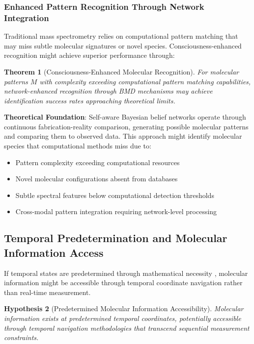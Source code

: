 \documentclass[11pt,a4paper]{article}
\newtheorem{theorem}{Theorem}[section]
\newtheorem{hypothesis}[theorem]{Hypothesis}
\theoremstyle{remark}
\begin{document}
\subsubsection{Enhanced Pattern Recognition Through Network Integration}

Traditional mass spectrometry relies on computational pattern matching that may miss subtle molecular signatures or novel species. Consciousness-enhanced recognition might achieve superior performance through:

\begin{theorem}[Consciousness-Enhanced Molecular Recognition]
For molecular patterns $M$ with complexity exceeding computational pattern matching capabilities, network-enhanced recognition through BMD mechanisms may achieve identification success rates approaching theoretical limits.
\end{theorem}

\textbf{Theoretical Foundation}: Self-aware Bayesian belief networks operate through continuous fabrication-reality comparison, generating possible molecular patterns and comparing them to observed data. This approach might identify molecular species that computational methods miss due to:

\begin{itemize}
\item Pattern complexity exceeding computational resources
\item Novel molecular configurations absent from databases
\item Subtle spectral features below computational detection thresholds
\item Cross-modal pattern integration requiring network-level processing
\end{itemize}

\subsection{Temporal Predetermination and Molecular Information Access}

If temporal states are predetermined through mathematical necessity \cite{sachikonye2024temporal}, molecular information might be accessible through temporal coordinate navigation rather than real-time measurement.

\begin{hypothesis}[Predetermined Molecular Information Accessibility]
Molecular information exists at predetermined temporal coordinates, potentially accessible through temporal navigation methodologies that transcend sequential measurement constraints.
\end{hypothesis}
\end{document}
